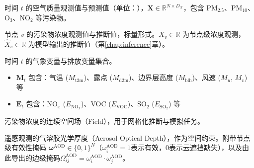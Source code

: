 
\begin{denotation}[3cm]

\item[\(\mathbf{X}_t, \hat{\mathbf{X}}_t\)] 时间 \(t\) 的空气质量观测值与预测值（单位：\ug{}），$\mathbf{X} \in \mathbb{R}^{N \times D_X}$，包含 PM\(_{2.5}\)、PM\(_{10}\)、O\(_3\)、NO\(_2\) 等污染物。
\item[\(X_v, \hat{X}_v\)] 节点 $v$ 的污染物浓度观测值与推断值，标量形式。$X_v \in \mathbb{R}$ 为节点级浓度观测，$\hat{X}_v \in \mathbb{R}$ 为模型输出的推断值（第\ref{chap:inference}章）。
\item[\(\mathbf{M}_t, \mathbf{E}_t\)] 时间 \(t\) 的气象变量与排放变量集合。
    \begin{itemize}
        \item \(\mathbf{M}_t\) 包含：气温 ($M_{\text{t2m}}$)、露点 ($M_{\text{d2m}}$)、边界层高度 ($M_{\text{blh}}$)、风速 ($M_{u}$, $M_{v}$) 等
        \item \(\mathbf{E}_t\) 包含：NO\(_x\) ($E_{\text{NO}_x}$)、VOC ($E_{\text{VOC}}$)、SO\(_2\) ($E_{\text{SO}_2}$) 等
    \end{itemize}
\item[\(\mathbf{X}^{F}_t\)] 污染物浓度的连续空间场（Field），用于网格化推断与模拟任务。
\item[\(\mathbf{X}^{\mathrm{AOD}}\)] 遥感观测的气溶胶光学厚度（Aerosol Optical Depth），作为空间约束。附带节点级有效性掩码 $\boldsymbol{\omega}^{\mathrm{AOD}} \in \{0,1\}^{N}$（$\omega_i^{\mathrm{AOD}} = 1$表示有效，$0$表示云遮挡缺失），以及由此导出的边级掩码$\Omega_{ij}^{\mathrm{AOD}} = \omega_i^{\mathrm{AOD}} \cdot \omega_j^{\mathrm{AOD}}$。


\end{denotation}
